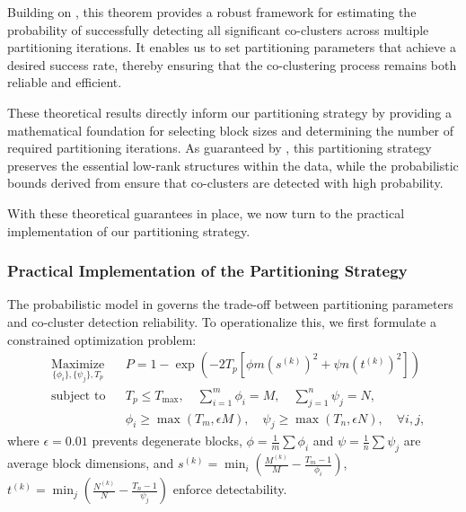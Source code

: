 \documentclass[journal]{IEEEtran}
\begin{document}
Building on , this theorem provides a robust framework for estimating the probability of successfully detecting all significant co-clusters across multiple partitioning iterations. It enables us to set partitioning parameters that achieve a desired success rate, thereby ensuring that the co-clustering process remains both reliable and efficient.

These theoretical results directly inform our partitioning strategy by providing a mathematical foundation for selecting block sizes and determining the number of required partitioning iterations. As guaranteed by , this partitioning strategy preserves the essential low-rank structures within the data, while the probabilistic bounds derived from  ensure that co-clusters are detected with high probability.

With these theoretical guarantees in place, we now turn to the practical implementation of our partitioning strategy.


\subsubsection{Practical Implementation of the Partitioning Strategy}
\label{subsec:practical_implementation}
The probabilistic model in  governs the trade-off between partitioning parameters and co-cluster detection reliability. To operationalize this, we first formulate a constrained optimization problem:
\begin{equation}
    \begin{aligned}
         & \underset{\{\phi_i\}, \{\psi_j\}, T_p}{\text{Maximize}}
         &                                                         & P = 1 - \exp\left( -2 T_p \left[ \phi m (s^{(k)})^2 + \psi n (t^{(k)})^2 \right] \right)                                                                                                  \\
         & \text{subject to}
         &                                                         & T_p \leq T_{\text{max}}, \quad \sum_{i=1}^m \phi_i = M, \quad \sum_{j=1}^n \psi_j = N,                                                                                                    \\
         &                                                         &                                                                                          & \phi_i \geq \max(T_m, \epsilon M), \quad \psi_j \geq \max(T_n, \epsilon N), \quad \forall i,j,
    \end{aligned}
\end{equation}
where $\epsilon = 0.01$ prevents degenerate blocks, $\phi = \frac{1}{m}\sum \phi_i$ and $\psi = \frac{1}{n}\sum \psi_j$ are average block dimensions, and $s^{(k)} = \min_i \left( \frac{M^{(k)}}{M} - \frac{T_m-1}{\phi_i} \right)$, $t^{(k)} = \min_j \left( \frac{N^{(k)}}{N} - \frac{T_n-1}{\psi_j} \right)$ enforce detectability.
\end{document}
